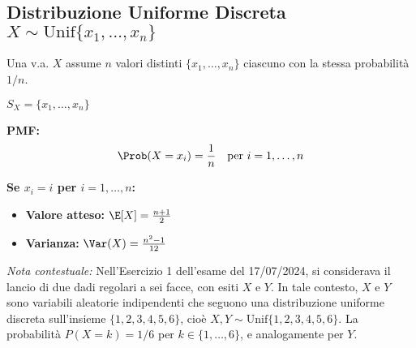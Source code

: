 \subsection{Distribuzione Uniforme Discreta \texorpdfstring{$X \sim \text{Unif}\{x_1, \dots, x_n\}$}{X ~ Unif}}
Una v.a. $X$ assume $n$ valori distinti $\{x_1, \dots, x_n\}$ ciascuno con la stessa probabilità $1/n$.

$S_X = \{x_1, \dots, x_n\}$

\textbf{PMF:} 
\[ \Prob(X=x_i) = \frac{1}{n} \quad \text{per } i=1, \dots, n \]

\textbf{Se $x_i = i$ per $i=1, \dots, n$:}
\begin{itemize}
    \item \textbf{Valore atteso:} $\E[X] = \frac{n+1}{2}$
    \item \textbf{Varianza:} $\Var(X) = \frac{n^2-1}{12}$
\end{itemize}

\noindent \textit{Nota contestuale:} Nell'Esercizio 1 dell'esame del 17/07/2024, si considerava il lancio di due dadi regolari a sei facce, con esiti $X$ e $Y$. In tale contesto, $X$ e $Y$ sono variabili aleatorie indipendenti che seguono una distribuzione uniforme discreta sull'insieme $\{1, 2, 3, 4, 5, 6\}$, cioè $X, Y \sim \text{Unif}\{1, 2, 3, 4, 5, 6\}$. La probabilità $P(X=k)=1/6$ per $k \in \{1, \dots, 6\}$, e analogamente per $Y$.

